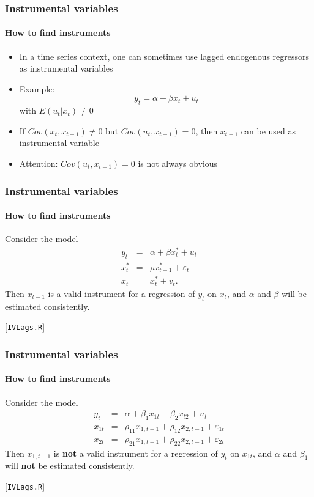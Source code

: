 \documentclass[notes=show]{beamer}
\begin{document}
\begin{frame}\frametitle{Instrumental variables}\framesubtitle{How to find instruments}
\begin{itemize}
    \item In a time series context, one can sometimes use lagged endogenous regressors as instrumental variables
    \item Example:
    \begin{equation*}
        y_{t}=\alpha +\beta x_{t}+u_{t}
    \end{equation*}%
    with $E(u_{t}|x_{t})\neq 0$
    \item If $Cov\left( x_{t},x_{t-1}\right) \neq 0$ but $Cov\left(u_{t},x_{t-1}\right) =0$,\newline
    then $x_{t-1}$ can be used as instrumental variable
    \item Attention: $Cov\left( u_{t},x_{t-1}\right) =0$ is not always obvious
\end{itemize}
\end{frame}


\begin{frame}\frametitle{Instrumental variables}\framesubtitle{How to find instruments}
\begin{example}
    Consider the model
    \begin{eqnarray*}
        y_{t} &=&\alpha +\beta x_{t}^{\ast }+u_{t} \\
        x_{t}^{\ast } &=&\rho x_{t-1}^{\ast }+\varepsilon _{t} \\
        x_{t} &=&x_{t}^{\ast }+v_{t}.
    \end{eqnarray*}
    Then $x_{t-1}$ is a valid instrument for a regression of $y_{t}$ on $x_{t}$,\newline
    and $\alpha $ and $\beta $ will be estimated consistently.
\end{example}
\hfill [\texttt{IVLags.R}]
\end{frame}


\begin{frame}\frametitle{Instrumental variables}\framesubtitle{How to find instruments}
\begin{example}
    Consider the model
    \begin{eqnarray*}
        y_{t} &=&\alpha +\beta _{1}x_{1t}+\beta _{2}x_{t2}+u_{t} \\
        x_{1t} &=&\rho _{11}x_{1,t-1}+\rho _{12}x_{2,t-1}+\varepsilon _{1t} \\
        x_{2t} &=&\rho _{21}x_{1,t-1}+\rho _{22}x_{2,t-1}+\varepsilon _{2t}
    \end{eqnarray*}%
    Then $x_{1,t-1}$ is \textbf{not} a valid instrument for a regression of $y_{t}$ on $x_{1t}$, and $\alpha $ and $\beta _{1}$ will \textbf{not} be estimated consistently.
\end{example}
\hfill [\texttt{IVLags.R}]
\end{frame}
\end{document}
